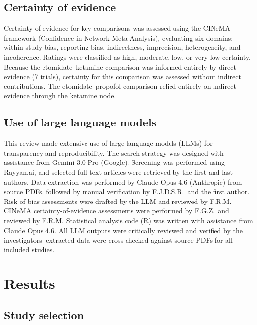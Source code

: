 \documentclass[11pt]{article}
\begin{document}
\subsection{Certainty of evidence}

Certainty of evidence for key comparisons was assessed using the CINeMA framework (Confidence in Network Meta-Analysis),\cite{nikolakopoulou2020} evaluating six domains: within-study bias, reporting bias, indirectness, imprecision, heterogeneity, and incoherence. Ratings were classified as high, moderate, low, or very low certainty. Because the etomidate--ketamine comparison was informed entirely by direct evidence (7 trials), certainty for this comparison was assessed without indirect contributions. The etomidate--propofol comparison relied entirely on indirect evidence through the ketamine node.

\subsection{Use of large language models}

This review made extensive use of large language models (LLMs) for transparency and reproducibility. The search strategy was designed with assistance from Gemini 3.0 Pro (Google). Screening was performed using Rayyan.ai, and selected full-text articles were retrieved by the first and last authors. Data extraction was performed by Claude Opus 4.6 (Anthropic) from source PDFs, followed by manual verification by F.J.D.S.R.\ and the first author. Risk of bias assessments were drafted by the LLM and reviewed by F.R.M. CINeMA certainty-of-evidence assessments were performed by F.G.Z.\ and reviewed by F.R.M. Statistical analysis code (R) was written with assistance from Claude Opus 4.6. All LLM outputs were critically reviewed and verified by the investigators; extracted data were cross-checked against source PDFs for all included studies.

\section{Results}

\subsection{Study selection}
\end{document}
